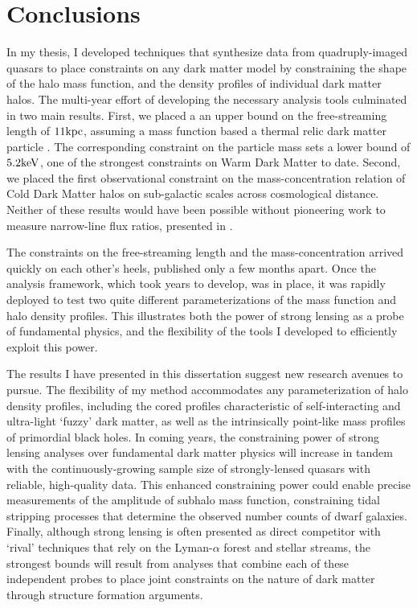 \chapter{Conclusions}

In my thesis, I developed techniques that synthesize data from quadruply-imaged quasars to place constraints on any dark matter model by constraining the shape of the halo mass function, and the density profiles of individual dark matter halos. The multi-year effort of developing the necessary analysis tools culminated in two main results. First, we placed a an upper bound on the free-streaming length of $11 \rm{kpc}$, assuming a mass function based a thermal relic dark matter particle \citep{Schneider++12}. The corresponding constraint on the particle mass sets a lower bound of $5.2 \rm{keV}$, one of the strongest constraints on Warm Dark Matter to date. Second, we placed the first observational constraint on the mass-concentration relation of Cold Dark Matter halos on sub-galactic scales across cosmological distance. Neither of these results would have been possible without pioneering work to measure narrow-line flux ratios, presented in \cite{Nierenberg++19}. 

The constraints on the free-streaming length and the mass-concentration arrived quickly on each other's heels, published only a few months apart. Once the analysis framework, which took years to develop, was in place, it was rapidly deployed to test two quite different parameterizations of the mass function and halo density profiles. This illustrates both the power of strong lensing as a probe of fundamental physics, and the flexibility of the tools I developed to efficiently exploit this power. 

The results I have presented in this dissertation suggest new research avenues to pursue. The flexibility of my method accommodates any parameterization of halo density profiles, including the cored profiles characteristic of self-interacting and ultra-light `fuzzy' dark matter, as well as the intrinsically point-like mass profiles of primordial black holes. In coming years, the constraining power of strong lensing analyses over fundamental dark matter physics will increase in tandem with the continuously-growing sample size of strongly-lensed quasars with reliable, high-quality data. This enhanced constraining power could enable precise measurements of the amplitude of subhalo mass function, constraining tidal stripping processes that determine the observed number counts of dwarf galaxies. Finally, although strong lensing is often presented as direct competitor with `rival' techniques that rely on the Lyman-$\alpha$ forest and stellar streams, the strongest bounds will result from analyses that combine each of these independent probes to place joint constraints on the nature of dark matter through structure formation arguments. 
